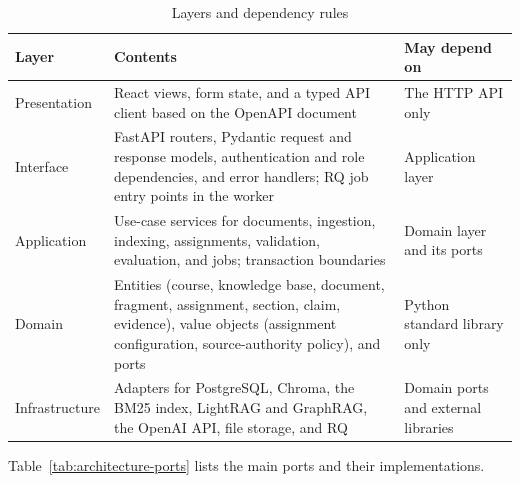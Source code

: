 \documentclass[12pt,a4paper]{article}
\begin{document}
\begin{table}[htbp]
\centering
\small
\renewcommand{\arraystretch}{1.3}
\begin{tabularx}{\textwidth}{|p{25mm}|X|p{42mm}|}
\hline
\textbf{Layer} &
\textbf{Contents} &
\textbf{May depend on} \\
\hline
Presentation &
React views, form state, and a typed API client based on the
OpenAPI document &
The HTTP API only \\
\hline
Interface &
FastAPI routers, Pydantic request and response models,
authentication and role dependencies, and error handlers; RQ job
entry points in the worker &
Application layer \\
\hline
Application &
Use-case services for documents, ingestion, indexing, assignments,
validation, evaluation, and jobs; transaction boundaries &
Domain layer and its ports \\
\hline
Domain &
Entities (course, knowledge base, document, fragment, assignment,
section, claim, evidence), value objects (assignment configuration,
source-authority policy), and ports &
Python standard library only \\
\hline
Infrastructure &
Adapters for PostgreSQL, Chroma, the BM25 index, LightRAG and
GraphRAG, the OpenAI API, file storage, and RQ &
Domain ports and external libraries \\
\hline
\end{tabularx}
\caption{Layers and dependency rules}
\label{tab:architecture-layers}
\end{table}

Table~\ref{tab:architecture-ports} lists the main ports and their
implementations.
\end{document}
